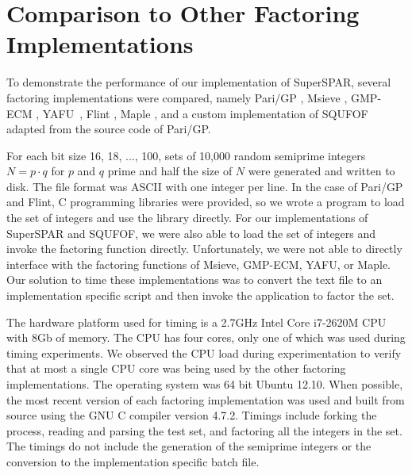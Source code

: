 \documentclass{ucalgthes1}
\theoremstyle{definition}
\newcommand{\compiler}{GNU C compiler version 4.7.2}
\newcommand{\cpu}{2.7GHz Intel Core i7-2620M CPU}
\begin{document}
\clearpage


\section{Comparison to Other Factoring Implementations}
\label{sec:ssparComparison}

To demonstrate the performance of our implementation of SuperSPAR, several factoring implementations were compared, namely Pari/GP \cite{PariGP}, Msieve \cite{Msieve}, GMP-ECM \cite{Ecm}, \mbox{YAFU \cite{Yafu}}, Flint \cite{Flint}, Maple \cite{Maple}, and a custom implementation of SQUFOF \cite{Gower2008} adapted from the source code of Pari/GP.

For each bit size 16, 18, ..., 100, sets of 10,000 random semiprime integers $N = p \cdot q$ for $p$ and $q$ prime and half the size of $N$ were generated and written to disk.  The file format was ASCII with one integer per line.  In the case of Pari/GP and Flint, C programming libraries were provided, so we wrote a program to load the set of integers and use the library directly.  For our implementations of SuperSPAR and SQUFOF, we were also able to load the set of integers and invoke the factoring function directly.   Unfortunately, we were not able to directly interface with the factoring functions of Msieve, GMP-ECM, YAFU, or Maple.  Our solution to time these implementations was to convert the text file to an implementation specific script and then invoke the application to factor the set.

The hardware platform used for timing is a \cpu{} with 8Gb of memory.  The CPU has four cores, only one of which was used during timing experiments.  We observed the CPU load during experimentation to verify that at most a single CPU core was being used by the other factoring implementations.  The operating system was 64 bit Ubuntu 12.10.  When possible, the most recent version of each factoring implementation was used and built from source using the \compiler{}.  Timings include forking the process, reading and parsing the test set, and factoring all the integers in the set.  The timings do not include the generation of the semiprime integers or the conversion to the implementation specific batch file.
\end{document}
